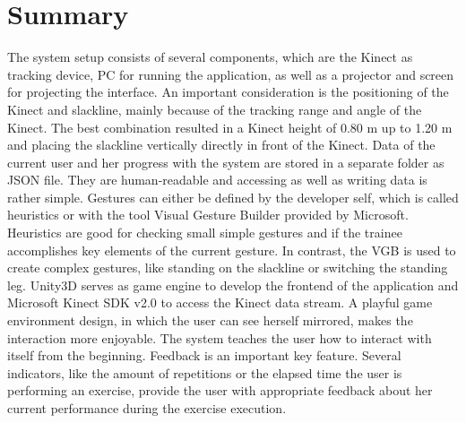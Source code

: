 \section{Summary}
The system setup consists of several components, which are the Kinect as tracking device, PC for running the application, as well as a projector and screen for projecting the interface.
An important consideration is the positioning of the Kinect and slackline, mainly because of the tracking range and angle of the Kinect.
The best combination resulted in a Kinect height of 0.80 m up to 1.20 m and placing the slackline vertically directly in front of the Kinect.
Data of the current user and her progress with the system are stored in a separate folder as JSON file.
They are human-readable and accessing as well as writing data is rather simple.
Gestures can either be defined by the developer self, which is called heuristics or with the tool Visual Gesture Builder provided by Microsoft.
Heuristics are good for checking small simple gestures and if the trainee accomplishes key elements of the current gesture.
In contrast, the VGB is used to create complex gestures, like standing on the slackline or switching the standing leg.
Unity3D serves as game engine to develop the frontend of the application and Microsoft Kinect SDK v2.0 to access the Kinect data stream.
A playful game environment design, in which the user can see herself mirrored, makes the interaction more enjoyable.
The system teaches the user how to interact with itself from the beginning.
Feedback is an important key feature.
Several indicators, like the amount of repetitions or the elapsed time the user is performing an exercise, provide the user with appropriate feedback about her current performance during the exercise execution.
